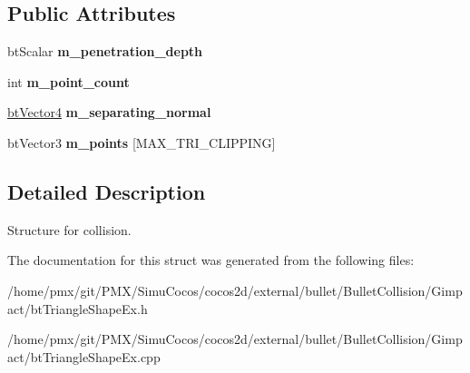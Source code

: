 \subsection*{Public Attributes}
\begin{DoxyCompactItemize}
\item 
\mbox{\label{structGIM__TRIANGLE__CONTACT_a242c6729137a8dba74c68152698cb2cb}} 
bt\+Scalar {\bfseries m\+\_\+penetration\+\_\+depth}
\item 
\mbox{\label{structGIM__TRIANGLE__CONTACT_ac8fba22b83fc01890236d2e746dc5e00}} 
int {\bfseries m\+\_\+point\+\_\+count}
\item 
\mbox{\label{structGIM__TRIANGLE__CONTACT_a64ceca536f460f79f6bf927133bda527}} 
\hyperlink{classbtVector4}{bt\+Vector4} {\bfseries m\+\_\+separating\+\_\+normal}
\item 
\mbox{\label{structGIM__TRIANGLE__CONTACT_af8c21b4d64476ac92c539c5b8f430de0}} 
bt\+Vector3 {\bfseries m\+\_\+points} \mbox{[}M\+A\+X\+\_\+\+T\+R\+I\+\_\+\+C\+L\+I\+P\+P\+I\+NG\mbox{]}
\end{DoxyCompactItemize}


\subsection{Detailed Description}
Structure for collision. 

The documentation for this struct was generated from the following files\+:\begin{DoxyCompactItemize}
\item 
/home/pmx/git/\+P\+M\+X/\+Simu\+Cocos/cocos2d/external/bullet/\+Bullet\+Collision/\+Gimpact/bt\+Triangle\+Shape\+Ex.\+h\item 
/home/pmx/git/\+P\+M\+X/\+Simu\+Cocos/cocos2d/external/bullet/\+Bullet\+Collision/\+Gimpact/bt\+Triangle\+Shape\+Ex.\+cpp\end{DoxyCompactItemize}
